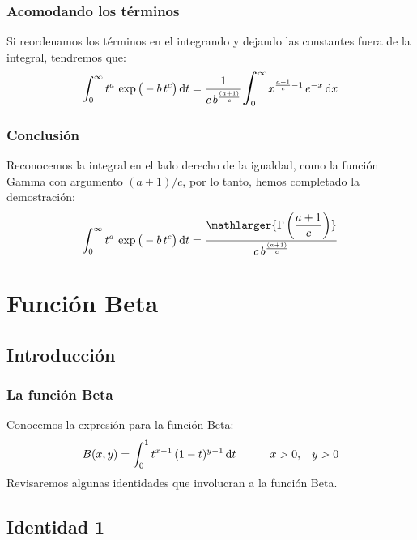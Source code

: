 \documentclass[12pt]{beamer}
\begin{document}
\begin{frame}
\frametitle{Acomodando los términos}
Si reordenamos los términos en el integrando y dejando las constantes fuera de la integral, tendremos que:
\begin{align*}
\int_{0}^{\infty} t^{a} \, \exp \big( -b \, t^{c} \big) \dd{t} = \dfrac{1}{c \, b^{\frac{(a+1)}{c}}} \scaleto{\int_{\text{\tiny{0}}}^{\text{\tiny{$\infty$}}}}{30pt} x^{\frac{a+1}{c} - 1} \, e^{-x} \dd{x}
\end{align*}
\end{frame}
\begin{frame}
\frametitle{Conclusión}
Reconocemos la integral en el lado derecho de la igualdad, como la función Gamma con argumento $(a+1)/c$, por lo tanto, hemos completado la demostración:
\begin{align*}
\int_{0}^{\infty} t^{a} \, \exp \big( -b \, t^{c} \big) \dd{t} = \dfrac{\mathlarger{\Gamma \left( \dfrac{a + 1}{c} \right)}}{c \, b^{\frac{(a+1)}{c}}} 
\end{align*}
\end{frame}

\section{Función Beta}
\subsection{Introducción}

\begin{frame}
\frametitle{La función Beta}
Conocemos la expresión para la función Beta:
\begin{align*}
B(x, y) = \int_{0}^{1} t^{x-1} \, (1 - t)^{y-1} \dd{t} \hspace{1cm} x > 0, \hspace{0.3cm} y > 0
\end{align*}
\pause
Revisaremos algunas identidades que involucran a la función Beta.
\end{frame}

\subsection{Identidad 1}
\end{document}
